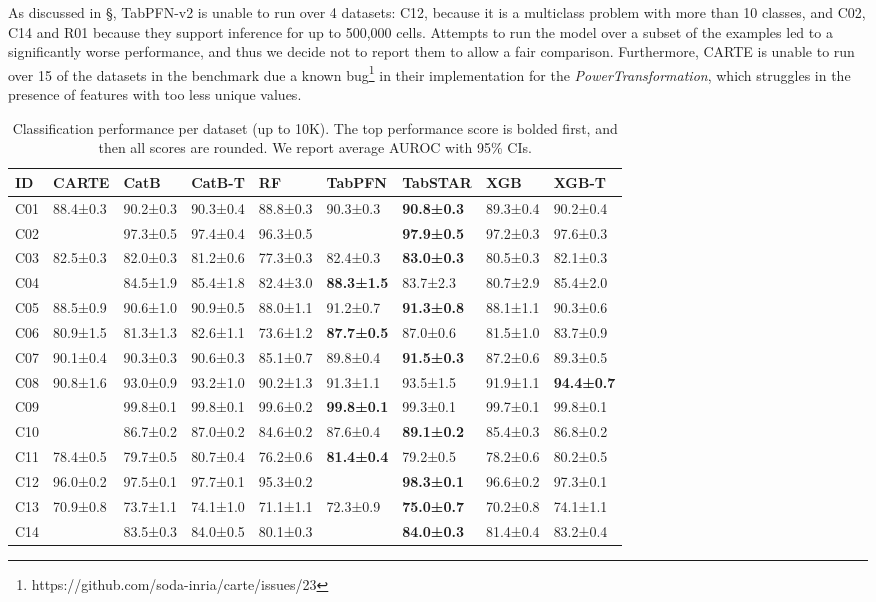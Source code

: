 As discussed in \S{}, TabPFN-v2 is unable to run over 4 datasets: C12, because it is a multiclass problem with more than 10 classes, and C02, C14 and R01 because they support inference for up to 500,000 cells. Attempts to run the model over a subset of the examples led to a significantly worse performance, and thus we decide not to report them to allow a fair comparison. Furthermore, CARTE is unable to run over 15 of the datasets in the benchmark due a known bug\footnote{https://github.com/soda-inria/carte/issues/23} in their implementation for the \textit{PowerTransformation}, which struggles in the presence of features with too less unique values.

\begin{table}
\center
\footnotesize
\caption{Classification performance per dataset (up to 10K). The top performance score is bolded first, and then all scores are rounded. We report average AUROC with 95\% CIs.}
\label{tab:cls_10k_dataset_performance}
\begin{tabular}{lllllllll}
\toprule
ID & CARTE & CatB & CatB-T & RF & TabPFN & TabSTAR & XGB & XGB-T \\
\midrule
C01 & 88.4±0.3 & 90.2±0.3 & 90.3±0.4 & 88.8±0.3 & 90.3±0.3 & \textbf{90.8±0.3} & 89.3±0.4 & 90.2±0.4 \\
C02 &  & 97.3±0.5 & 97.4±0.4 & 96.3±0.5 &  & \textbf{97.9±0.5} & 97.2±0.3 & 97.6±0.3 \\
C03 & 82.5±0.3 & 82.0±0.3 & 81.2±0.6 & 77.3±0.3 & 82.4±0.3 & \textbf{83.0±0.3} & 80.5±0.3 & 82.1±0.3 \\
C04 &  & 84.5±1.9 & 85.4±1.8 & 82.4±3.0 & \textbf{88.3±1.5} & 83.7±2.3 & 80.7±2.9 & 85.4±2.0 \\
C05 & 88.5±0.9 & 90.6±1.0 & 90.9±0.5 & 88.0±1.1 & 91.2±0.7 & \textbf{91.3±0.8} & 88.1±1.1 & 90.3±0.6 \\
C06 & 80.9±1.5 & 81.3±1.3 & 82.6±1.1 & 73.6±1.2 & \textbf{87.7±0.5} & 87.0±0.6 & 81.5±1.0 & 83.7±0.9 \\
C07 & 90.1±0.4 & 90.3±0.3 & 90.6±0.3 & 85.1±0.7 & 89.8±0.4 & \textbf{91.5±0.3} & 87.2±0.6 & 89.3±0.5 \\
C08 & 90.8±1.6 & 93.0±0.9 & 93.2±1.0 & 90.2±1.3 & 91.3±1.1 & 93.5±1.5 & 91.9±1.1 & \textbf{94.4±0.7} \\
C09 &  & 99.8±0.1 & 99.8±0.1 & 99.6±0.2 & \textbf{99.8±0.1} & 99.3±0.1 & 99.7±0.1 & 99.8±0.1 \\
C10 &  & 86.7±0.2 & 87.0±0.2 & 84.6±0.2 & 87.6±0.4 & \textbf{89.1±0.2} & 85.4±0.3 & 86.8±0.2 \\
C11 & 78.4±0.5 & 79.7±0.5 & 80.7±0.4 & 76.2±0.6 & \textbf{81.4±0.4} & 79.2±0.5 & 78.2±0.6 & 80.2±0.5 \\
C12 & 96.0±0.2 & 97.5±0.1 & 97.7±0.1 & 95.3±0.2 &  & \textbf{98.3±0.1} & 96.6±0.2 & 97.3±0.1 \\
C13 & 70.9±0.8 & 73.7±1.1 & 74.1±1.0 & 71.1±1.1 & 72.3±0.9 & \textbf{75.0±0.7} & 70.2±0.8 & 74.1±1.1 \\
C14 &  & 83.5±0.3 & 84.0±0.5 & 80.1±0.3 &  & \textbf{84.0±0.3} & 81.4±0.4 & 83.2±0.4 \\
\bottomrule
\end{tabular}
\end{table}


